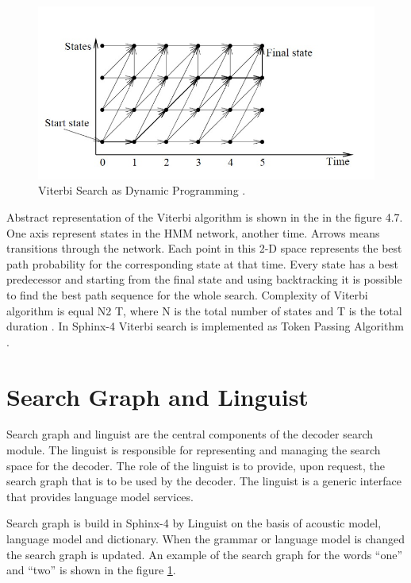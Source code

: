 \begin{figure}[htbp]
  \centering
    \includegraphics[width=1.0\textwidth]{images/viterbi.png}
 \caption{Viterbi Search as Dynamic Programming \parencite
{Ravishankar96efficientalgorithms}.}
  \label{fig:hmm}
\end {figure}

Abstract representation of the Viterbi algorithm is shown in the in the figure 4.7. One axis represent states in the HMM network, another time.
 Arrows means transitions through the network. Each point in this 2-D space represents the best path probability for the corresponding state at that time. 
 Every state has a best predecessor and starting from the final state and using backtracking it is possible to find the best path sequence for the whole search.
Complexity of Viterbi algorithm is equal N2 T, where N is the total number of
states and T is the total duration \parencite
{Ravishankar96efficientalgorithms}. In Sphinx-4 Viterbi search is implemented as
Token Passing Algorithm \parencite {Young89Token}. 

\section {Search Graph and Linguist} 

Search graph and linguist are the central components of the decoder search
module.  The linguist is responsible for representing and managing the search
space for the decoder. The role of the linguist is to provide, upon request, the search graph that is to be used by the decoder.
The linguist is a generic interface that provides language model services.

Search graph is build in Sphinx-4 by Linguist on the basis of acoustic
model, language model and dictionary. When the grammar or language model is changed the
search graph is updated.  An example of the search graph for the words ``one''
and ``two'' is shown in the figure \ref{fig:hmm}.

